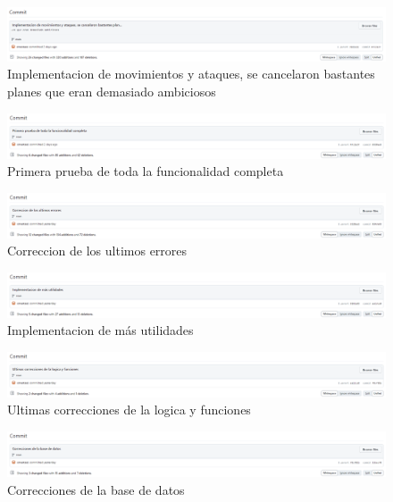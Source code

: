 \documentclass{article}
\begin{document}
\begin{figure}[H]
	\centering
	\includegraphics[width=1\textwidth,keepaspectratio]{img/commit_24.png}
	\caption{Implementacion de movimientos y ataques, se cancelaron bastantes planes que eran demasiado ambiciosos}
\end{figure}
\begin{figure}[H]
	\centering
	\includegraphics[width=1\textwidth,keepaspectratio]{img/commit_25.png}
	\caption{Primera prueba de toda la funcionalidad completa}
\end{figure}
\begin{figure}[H]
	\centering
	\includegraphics[width=1\textwidth,keepaspectratio]{img/commit_26.png}
	\caption{Correccion de los ultimos errores}
\end{figure}
\begin{figure}[H]
	\centering
	\includegraphics[width=1\textwidth,keepaspectratio]{img/commit_27.png}
	\caption{Implementacion de más utilidades}
\end{figure}
\begin{figure}[H]
	\centering
	\includegraphics[width=1\textwidth,keepaspectratio]{img/commit_28.png}
	\caption{Ultimas correcciones de la logica y funciones}
\end{figure}
\begin{figure}[H]
	\centering
	\includegraphics[width=1\textwidth,keepaspectratio]{img/commit_29.png}
	\caption{Correcciones de la base de datos}
\end{figure}
\end{document}
